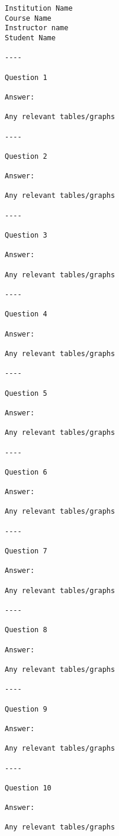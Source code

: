 \documentclass[11pt,]{article}
\begin{document}
\begin{verbatim}
Institution Name
Course Name
Instructor name
Student Name

----

Question 1

Answer:

Any relevant tables/graphs

----

Question 2

Answer:

Any relevant tables/graphs

----

Question 3

Answer:

Any relevant tables/graphs

----

Question 4

Answer:

Any relevant tables/graphs

----

Question 5

Answer:

Any relevant tables/graphs

----

Question 6

Answer:

Any relevant tables/graphs

----

Question 7

Answer:

Any relevant tables/graphs

----

Question 8

Answer:

Any relevant tables/graphs

----

Question 9

Answer:

Any relevant tables/graphs

----

Question 10

Answer:

Any relevant tables/graphs
\end{verbatim}
\end{document}
